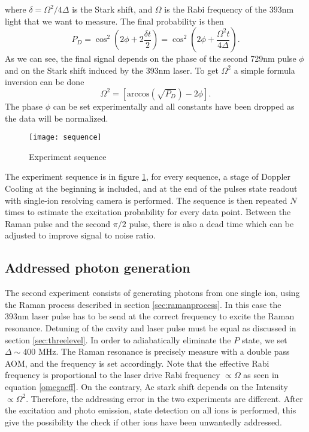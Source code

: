 where $\delta = \Omega^2/4\Delta$ is the Stark shift, and $\Omega$ is the Rabi frequency of the 393nm light that we want to measure. The final probability is then
\begin{equation}
P_D = \cos^2\left(2\phi + 2\frac{\delta t}{2}\right) = \cos^2\left(2\phi + \frac{\Omega^2 t}{4\Delta}\right).
\end{equation}
As we can see, the final signal depends on the phase of the second 729nm pulse $\phi$ and on the Stark shift induced by the 393nm laser. To get $\Omega^2$ a simple formula inversion can be done
\begin{equation}
\label{eq:ptointensity}
\Omega^2 = \left[\text{arccos}\left(\sqrt{P_D}\right)-2\phi \right].
\end{equation}
 The phase $\phi$ can be set experimentally and all constants have been dropped as the data will be normalized.\\
\begin{figure}
\centering
\texttt{[image: sequence]}
\caption{Experiment sequence}
\label{sequence}
\end{figure}
The experiment sequence is in figure \ref{sequence}, for every sequence, a stage of Doppler Cooling at the beginning is included, and at the end of the pulses state readout with single-ion resolving camera is performed. The sequence is then repeated $N$ times to estimate the excitation probability for every data point. Between the Raman pulse and the second $\pi/2$ pulse, there is also a dead time which can be adjusted to improve signal to noise ratio.\\

\subsection{Addressed photon generation}
The second experiment consists of generating photons from one single ion, using the Raman process described in section \ref{sec:ramanprocess}. In this case the 393nm laser pulse has to be send at the correct frequency to excite the Raman resonance. Detuning of the cavity and laser pulse must be equal as discussed in section \ref{sec:threelevel}. In order to adiabatically eliminate the $P$ state, we set $\Delta \sim 400$ MHz. The Raman resonance is precisely measure with a double pass AOM, and the frequency is set accordingly. Note that the effective Rabi frequency is proportional to the laser drive Rabi frequency $\propto \Omega$ as seen in equation \eqref{omegaeff}. On the contrary, Ac stark shift depends on the Intensity $\propto \Omega^2$. Therefore, the addressing error in the two experiments are different. After the excitation and photo emission, state detection on all ions is performed, this give the possibility the check if other ions have been unwantedly addressed.
